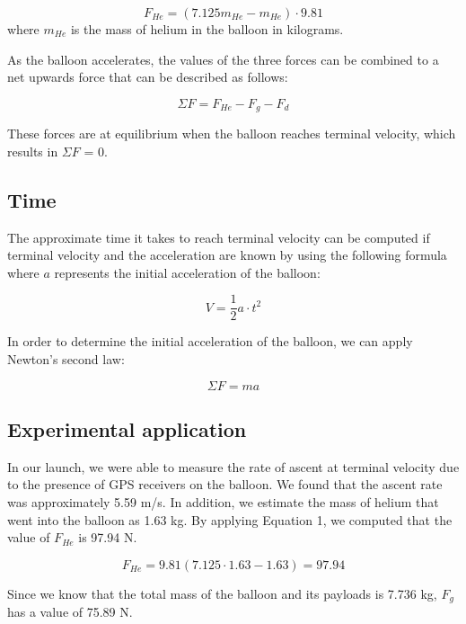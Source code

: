 \documentclass[useAMS,usenatbib]{mn2e}
\begin{document}
\begin{equation}
F_{He} = (7.125m_{He} - m_{He}) \cdot 9.81
\end{equation}
where $m_{He}$ is the mass of helium in the balloon in kilograms. 

As the balloon accelerates, the values of the three forces can be combined to a net upwards force that can be described as follows:

\begin{equation}
\Sigma F= F_{He} - F_g - F_d
\end{equation}


These forces are at equilibrium when the balloon reaches terminal velocity, which results in $\Sigma F$ = 0.

\subsection[]{Time}
The approximate time it takes to reach terminal velocity can be computed if terminal velocity and the acceleration are known by using the following formula where $a$ represents the initial acceleration of the balloon:

\begin{equation}
V = \frac{1}{2}a\cdot{}t^{2}
\end{equation}



In order to determine the initial acceleration of the balloon, we can apply Newton's second law:

\begin{equation}
\Sigma F = ma
\end{equation}

\subsection[]{Experimental application}
In our launch, we were able to measure the rate of ascent at terminal velocity due to the presence of GPS receivers on the balloon. We found that the ascent rate was approximately 5.59 m/s. In addition, we estimate the mass of helium that went into the balloon as 1.63 kg. By applying Equation 1, we computed that the value of $F_{He}$ is 97.94 N.

\begin{equation}
F_{He} = 9.81 (7.125 \cdot 1.63  - 1.63) = 97.94
\end{equation}

Since we know that the total mass of the balloon and its payloads is 7.736 kg, $F_g$ has a value of 75.89 N.
\end{document}
